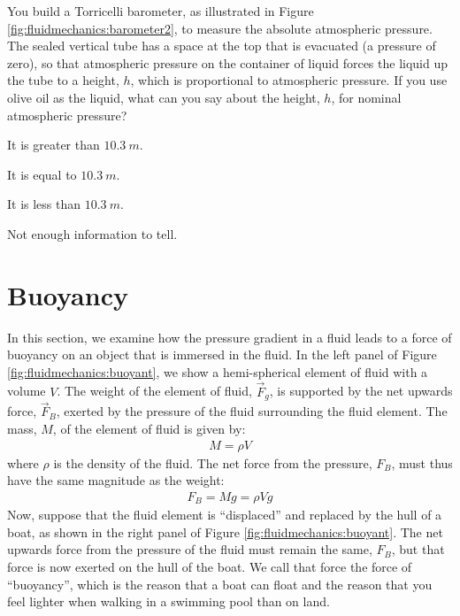 {{\begin{checkpoint}
\begin{MCquestion}{You build a Torricelli barometer, as illustrated in Figure \ref{fig:fluidmechanics:barometer2}, to measure the absolute atmospheric pressure. The sealed vertical tube has a space at the top that is evacuated (a pressure of zero), so that atmospheric pressure on the container of liquid forces the liquid up the tube to a height, $h$, which is proportional to atmospheric pressure. If you use olive oil as the liquid, what can you say about the height, $h$, for nominal atmospheric pressure?}
\item It is greater than $\SI{10.3}{m}$.\correct
\item It is equal to $\SI{10.3}{m}$.
\item It is less than $\SI{10.3}{m}$.
\item Not enough information to tell.
\end{MCquestion}
\end{checkpoint}

\section{Buoyancy}
In this section, we examine how the pressure gradient in a fluid leads to a force of buoyancy on an object that is immersed in the fluid.
In the left panel of Figure \ref{fig:fluidmechanics:buoyant}, we show a hemi-spherical element of fluid with a volume $V$. The weight of the element of fluid, $\vec F_g$, is supported by the net upwards force, $\vec F_B$, exerted by the pressure of the fluid surrounding the fluid element. The mass, $M$, of the element of fluid is given by:
\begin{align*}
M = \rho V
\end{align*} 
where $\rho$ is the density of the fluid. The net force from the pressure, $F_B$, must thus have the same magnitude as the weight:
\begin{align*}
F_B = Mg = \rho V g
\end{align*}
Now, suppose that the fluid element is ``displaced'' and replaced by the hull of a boat, as shown in the right panel of Figure \ref{fig:fluidmechanics:buoyant}. The net upwards force from the pressure of the fluid must remain the same, $F_B$, but that force is now exerted on the hull of the boat. We call that force the force of ``buoyancy'', which is the reason that a boat can float and the reason that you feel lighter when walking in a swimming pool than on land. 

}}
